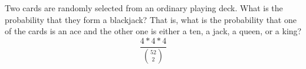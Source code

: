 \item Two cards are randomly selected from an ordinary playing deck. What is the probability that they form a blackjack? That is, what is the probability that one of the cards is an ace and the other one is either a ten, a jack, a queen, or a king?
\[
\frac{4 * 4 * 4}{\binom{52}{2}}
\]